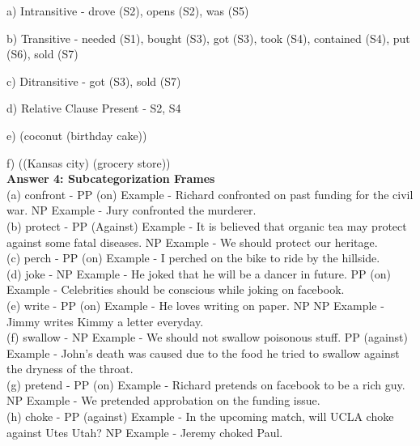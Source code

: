 \documentclass{article}
\begin{document}
a) Intransitive - drove (S2), opens (S2), was (S5)

b) Transitive - needed (S1), bought (S3), got (S3), took (S4), contained (S4), put (S6), sold (S7)

c) Ditransitive - got (S3), sold (S7)

d) Relative Clause Present - S2, S4

e) (coconut (birthday cake))

f) ((Kansas city) (grocery store)) 
\\[10pt]
\textbf {Answer 4: Subcategorization Frames}
\\[10pt]
(a) confront - 
PP (on)
Example - Richard confronted on past funding for the civil war.
NP
Example - Jury confronted the murderer.
\\[10pt]
(b) protect - 
PP (Against) 
Example - It is believed that organic tea may protect against some fatal diseases.
NP
Example - We should protect our heritage.
\\[10pt]
(c) perch -
PP (on)
Example -  I perched on the bike to ride by the hillside.             
\\[10pt]
(d) joke - 
NP
Example - He joked that he will be a dancer in future.
PP (on)
Example - Celebrities should be conscious while joking on facebook. 
\\[10pt]
(e) write - 
PP (on)
Example - He loves writing on paper.
NP NP
Example - Jimmy writes Kimmy a letter everyday.
\\[10pt]
(f) swallow - 
NP
Example - We should not swallow poisonous stuff. 
PP (against)
Example - John's death was caused due to the food he tried to swallow against the dryness of the throat.
\\[10pt]
(g) pretend - 
PP (on)
Example - Richard pretends on facebook to be a rich guy.
NP
Example - We pretended approbation on the funding issue.
\\[10pt]
(h) choke - 
PP (against)
Example - In the upcoming match, will UCLA choke against Utes Utah?
NP
Example - Jeremy choked Paul.
\\[10pt]
\end{document}
